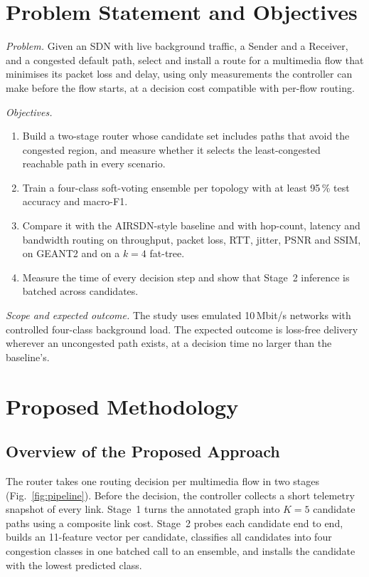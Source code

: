 \documentclass[conference,a4paper]{IEEEtran}
\begin{document}
\section{Problem Statement and Objectives}
\textit{Problem.} Given an SDN with live background traffic, a Sender and a Receiver, and a congested default path,
select and install a route for a multimedia flow that minimises its packet loss and delay, using only measurements
the controller can make before the flow starts, at a decision cost compatible with per-flow routing.

\textit{Objectives.}
\begin{enumerate}
\item Build a two-stage router whose candidate set includes paths that avoid the congested region, and measure
whether it selects the least-congested reachable path in every scenario.
\item Train a four-class soft-voting ensemble per topology with at least 95\,\% test accuracy and macro-F1.
\item Compare it with the AIRSDN-style baseline and with hop-count, latency and bandwidth routing on throughput,
packet loss, RTT, jitter, PSNR and SSIM, on GEANT2 and on a $k=4$ fat-tree.
\item Measure the time of every decision step and show that Stage~2 inference is batched across candidates.
\end{enumerate}

\textit{Scope and expected outcome.} The study uses emulated 10\,Mbit/s networks with controlled four-class
background load. The expected outcome is loss-free delivery wherever an uncongested path exists, at a decision
time no larger than the baseline's.

\section{Proposed Methodology}
\subsection{Overview of the Proposed Approach}
The router takes one routing decision per multimedia flow in two stages (Fig.~\ref{fig:pipeline}). Before the
decision, the controller collects a short telemetry snapshot of every link. Stage~1 turns the annotated graph into
$K=5$ candidate paths using a composite link cost. Stage~2 probes each candidate end to end, builds an 11-feature
vector per candidate, classifies all candidates into four congestion classes in one batched call to an ensemble,
and installs the candidate with the lowest predicted class.
\end{document}
